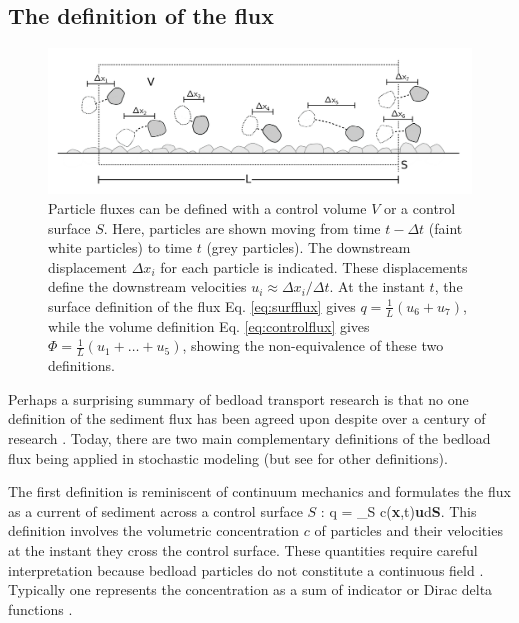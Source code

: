 \subsection{The definition of the flux}
\begin{figure}[!htbp]
	\includegraphics[width=\linewidth,keepaspectratio]{./figures/ch1/fluxDefinitions.png}
	\caption{Particle fluxes can be defined with a control volume $V$ or a control surface $S$. Here, particles are shown moving from time $t-\Delta t$ (faint white particles) to time $t$ (grey particles). The downstream displacement $\Delta x_i$ for each particle is indicated. These displacements define the downstream velocities $u_i \approx \Delta x_i/\Delta t.$ At the instant $t$, the surface definition of the flux Eq. \ref{eq:surfflux} gives $q = \frac{1}{L}(u_6+u_7)$, while the volume definition Eq. \ref{eq:controlflux} gives $\Phi = \frac{1}{L}(u_1+\dots+u_5)$,
	showing the non-equivalence of these two definitions.}
	\label{fig:fluxdefs}
\end{figure}
Perhaps a surprising summary of bedload transport research is that no one definition of the sediment flux has been agreed upon despite over a century of research \citep{Ballio2018}.
Today, there are two main complementary definitions of the bedload flux being applied in stochastic modeling (but see \citet{Ballio2014,Ballio2018} for other definitions).

The first definition is reminiscent of continuum mechanics and formulates the flux as a current of sediment across a control surface $S$ \citep{Furbish2012,Heyman2016,Ballio2014}: 
\be q = \int_S c(\textbf{x},t)\textbf{u}\cdot d\textbf{S}. \label{eq:surfflux} \ee
This definition involves the volumetric concentration $c$ of particles and their velocities at the instant they cross the control surface. These quantities require careful interpretation because bedload particles do not constitute a continuous field \citep{Furbish2012a}. Typically one represents the concentration as a sum of indicator or Dirac delta functions \citep[cf.][Sec. 8.5.1]{Gardiner1983}.

